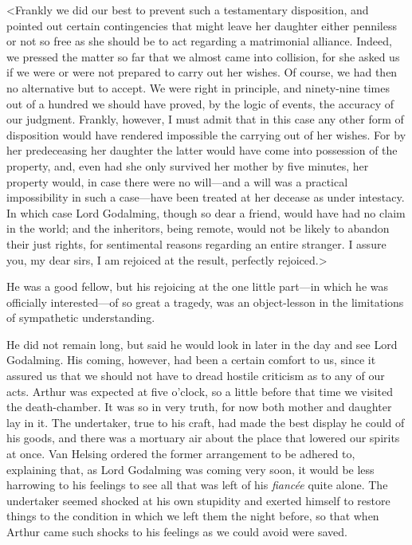 <Frankly we did our best to prevent such a testamentary disposition, and pointed out certain contingencies that might leave her daughter either penniless or not so free as she should be to act regarding a matrimonial alliance. Indeed, we pressed the matter so far that we almost came into collision, for she asked us if we were or were not prepared to carry out her wishes. Of course, we had then no alternative but to accept. We were right in principle, and ninety-nine times out of a hundred we should have proved, by the logic of events, the accuracy of our judgment. Frankly, however, I must admit that in this case any other form of disposition would have rendered impossible the carrying out of her wishes. For by her predeceasing her daughter the latter would have come into possession of the property, and, even had she only survived her mother by five minutes, her property would, in case there were no will—and a will was a practical impossibility in such a case—have been treated at her decease as under intestacy. In which case Lord Godalming, though so dear a friend, would have had no claim in the world; and the inheritors, being remote, would not be likely to abandon their just rights, for sentimental reasons regarding an entire stranger. I assure you, my dear sirs, I am rejoiced at the result, perfectly rejoiced.>

He was a good fellow, but his rejoicing at the one little part—in which he was officially interested—of so great a tragedy, was an object-lesson in the limitations of sympathetic understanding.

He did not remain long, but said he would look in later in the day and see Lord Godalming. His coming, however, had been a certain comfort to us, since it assured us that we should not have to dread hostile criticism as to any of our acts. Arthur was expected at five o'clock, so a little before that time we visited the death-chamber. It was so in very truth, for now both mother and daughter lay in it. The undertaker, true to his craft, had made the best display he could of his goods, and there was a mortuary air about the place that lowered our spirits at once. Van Helsing ordered the former arrangement to be adhered to, explaining that, as Lord Godalming was coming very soon, it would be less harrowing to his feelings to see all that was left of his \textit{fiancée} quite alone. The undertaker seemed shocked at his own stupidity and exerted himself to restore things to the condition in which we left them the night before, so that when Arthur came such shocks to his feelings as we could avoid were saved.

